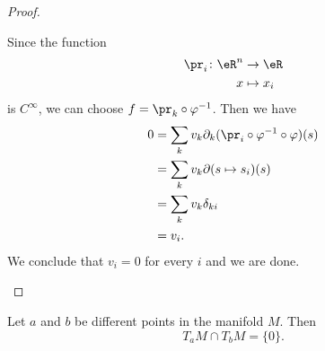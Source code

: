 \begin{proof}
\begin{subproof}
            Since the function
            \begin{equation}
                \begin{aligned}
                    \pr_i\colon \eR^n&\to \eR \\
                    x&\mapsto x_i 
                \end{aligned}
            \end{equation}
            is \(  C^{\infty}\), we can choose \( f=\pr_k\circ\varphi^{-1}\). Then we have
            \begin{subequations}
                \begin{align}
                    0&=\sum_kv_k\partial_k(\pr_i\circ\varphi^{-1}\circ\varphi)(s)\\
                    &=\sum_kv_k\partial(s\mapsto s_i)(s)\\
                    &=\sum_kv_k\delta_{ki}\\
                    &=v_i.
                \end{align}
            \end{subequations}
            We conclude that \( v_i=0\) for every \( i\) and we are done.
    \end{subproof}
\end{proof}

\begin{lemma}
    Let \( a\) and \( b\) be different points in the manifold \( M\). Then
    \begin{equation}
        T_aM\cap T_bM=\{ 0 \}.
    \end{equation}
\end{lemma}


